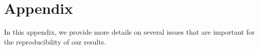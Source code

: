 \section{Appendix}
\label{sxn:appendix}

In this appendix, we provide more details on several issues that are important for the reproducibility of our results.

